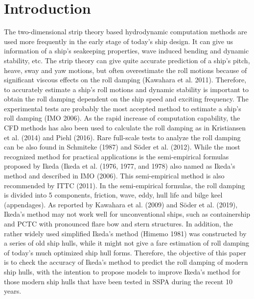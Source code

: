 \section{Introduction}
\label{se:introduction}

%    

The two-dimensional strip theory based hydrodynamic computation methods are used more frequently in the early stage of today's ship design. It can give us information of a ship's seakeeping properties, wave induced bending and dynamic stability, etc. The strip theory can give quite accurate prediction of a ship's pitch, heave, sway and yaw motions, but often overestimate the roll motions because of significant viscous effects on the roll damping (Kawahara et al. 2011). Therefore, to accurately estimate a ship's roll motions and dynamic stability is important to obtain the roll damping dependent on the ship speed and exciting frequency. The experimental tests are probably the most accepted method to estimate a ship's roll damping (IMO 2006). As the rapid increase of computation capability, the CFD methods has also been used to calculate the roll damping as in Kristiansen et al. (2014) and Piehl (2016). Rare full-scale tests to analyze the roll damping can be also found in Schmiteke (1987) and S\"oder et al. (2012). While the most recognized method for practical applications is the semi-empirical formulas proposed by Ikeda (Ikeda et al. (1976, 1977, and 1978)  also named as Ikeda's method and described in IMO (2006). This semi-empirical method is also recommended by ITTC (2011). In the semi-empirical formulas, the roll damping is divided into 5 components, friction, wave, eddy, hull life and bilge keel (appendages). As reported by Kawahara et al. (2009) and S\"oder et al. (2019), Ikeda's method may not work well for unconventional ships, such as containership and PCTC with pronounced flare bow and stern structures. In addition, the rather widely used simplified Ikeda's method (Himemo 1981) was constructed by a series of old ship hulls, while it might not give a fare estimation of roll damping of today's much optimized ship hull forms. Therefore, the objective of this paper is to check the accuracy of Ikeda's method to predict the roll damping of modern ship hulls, with the intention to propose models to improve Ikeda's method for those modern ship hulls that have been tested in SSPA during the recent 10 years.

